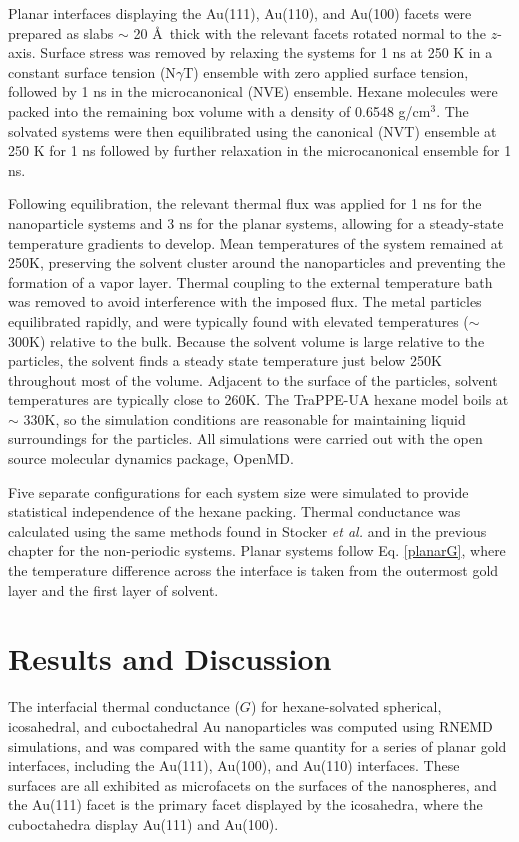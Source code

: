 Planar interfaces displaying the Au(111), Au(110), and Au(100) facets
were prepared as slabs $\sim$ 20 \AA\ thick with the relevant facets
rotated normal to the $z$-axis. Surface stress was removed by relaxing
the systems for 1 ns at 250 K in a constant surface tension
(N\(\gamma\)T) ensemble with zero applied surface tension, followed by
1 ns in the microcanonical (NVE) ensemble.  Hexane molecules were
packed into the remaining box volume with a density of 0.6548
g/cm$^3$. The solvated systems were then equilibrated using the
canonical (NVT) ensemble at 250 K for 1 ns followed by further
relaxation in the microcanonical ensemble for 1 ns.

Following equilibration, the relevant thermal flux was applied for 1
ns for the nanoparticle systems and 3 ns for the planar systems,
allowing for a steady-state temperature gradients to develop. Mean
temperatures of the system remained at 250K, preserving the solvent
cluster around the nanoparticles and preventing the formation of a
vapor layer. Thermal coupling to the external temperature bath was
removed to avoid interference with the imposed flux. The metal
particles equilibrated rapidly, and were typically found with elevated
temperatures ($\sim$300K) relative to the bulk. Because the solvent
volume is large relative to the particles, the solvent finds a steady
state temperature just below 250K throughout most of the
volume. Adjacent to the surface of the particles, solvent temperatures
are typically close to 260K. The TraPPE-UA hexane model boils at
$\sim$ 330K, so the simulation conditions are reasonable for
maintaining liquid surroundings for the particles.  All simulations
were carried out with the open source molecular dynamics package,
OpenMD.\cite{openmd,OOPSE}

Five separate configurations for each system size were simulated to
provide statistical independence of the hexane packing.  Thermal
conductance was calculated using the same methods found in Stocker
\textit{et al.}\cite{Stocker2016} and in the previous chapter for the non-periodic systems.
Planar systems follow Eq. \ref{planarG}, where the temperature difference across the interface is taken from the outermost gold layer and the first layer of solvent. 

\section{Results and Discussion}
The interfacial thermal conductance ($G$) for hexane-solvated
spherical, icosahedral, and cuboctahedral Au nanoparticles was
computed using RNEMD simulations, and was compared with the same
quantity for a series of planar gold interfaces, including the
Au(111), Au(100), and Au(110) interfaces.  These surfaces are all
exhibited as microfacets on the surfaces of the nanospheres, and the
Au(111) facet is the primary facet displayed by the icosahedra,
where the cuboctahedra display Au(111) and Au(100).

